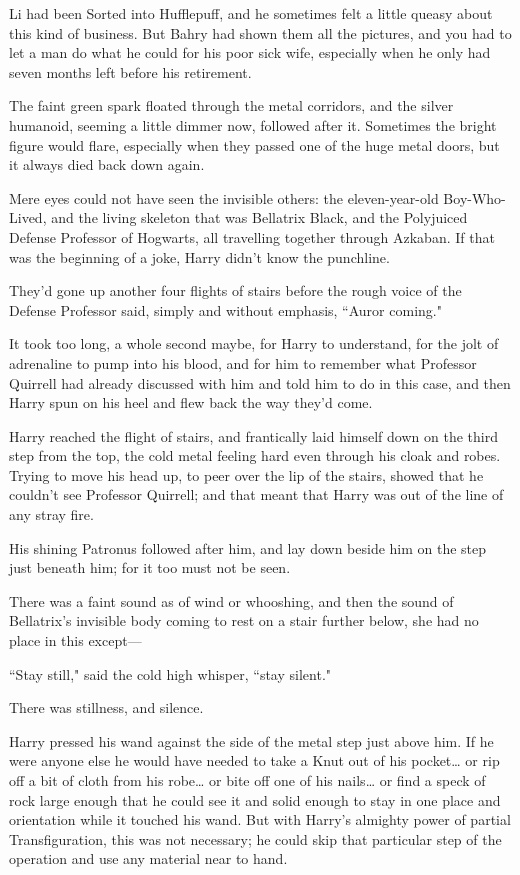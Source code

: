 Li had been Sorted into Hufflepuff, and he sometimes felt a little queasy about this kind of business. But Bahry had shown them all the pictures, and you had to let a man do what he could for his poor sick wife, especially when he only had seven months left before his retirement.

\later

The faint green spark floated through the metal corridors, and the silver humanoid, seeming a little dimmer now, followed after it. Sometimes the bright figure would flare, especially when they passed one of the huge metal doors, but it always died back down again.

Mere eyes could not have seen the invisible others: the eleven-year-old Boy-Who-Lived, and the living skeleton that was Bellatrix Black, and the Polyjuiced Defense Professor of Hogwarts, all travelling together through Azkaban. If that was the beginning of a joke, Harry didn't know the punchline.

They'd gone up another four flights of stairs before the rough voice of the Defense Professor said, simply and without emphasis, ``Auror coming."

It took too long, a whole second maybe, for Harry to understand, for the jolt of adrenaline to pump into his blood, and for him to remember what Professor Quirrell had already discussed with him and told him to do in this case, and then Harry spun on his heel and flew back the way they'd come.

Harry reached the flight of stairs, and frantically laid himself down on the third step from the top, the cold metal feeling hard even through his cloak and robes. Trying to move his head up, to peer over the lip of the stairs, showed that he couldn't see Professor Quirrell; and that meant that Harry was out of the line of any stray fire.

His shining Patronus followed after him, and lay down beside him on the step just beneath him; for it too must not be seen.

There was a faint sound as of wind or whooshing, and then the sound of Bellatrix's invisible body coming to rest on a stair further below, she had no place in this except—

``Stay still," said the cold high whisper, ``stay silent."

There was stillness, and silence.

Harry pressed his wand against the side of the metal step just above him. If he were anyone else he would have needed to take a Knut out of his pocket{\ldots} or rip off a bit of cloth from his robe{\ldots} or bite off one of his nails{\ldots} or find a speck of rock large enough that he could see it and solid enough to stay in one place and orientation while it touched his wand. But with Harry's almighty power of partial Transfiguration, this was not necessary; he could skip that particular step of the operation and use any material near to hand.

